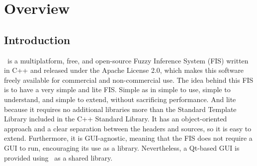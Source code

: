 \chapter{Overview}

\section{Introduction}
\fl\ is a multiplatform, free, and open-source Fuzzy Inference System (FIS) written in C++ and released under the Apache License 2.0, which makes this software freely available for commercial and non-commercial use. The idea behind this FIS is to have a very simple and lite FIS. Simple as in simple to use, simple to understand, and simple to extend, without sacrificing performance. And lite because it requires no additional libraries more than the Standard Template Library included in the C++ Standard Library. It has an object-oriented approach and a clear separation between the headers and sources, so it is easy to extend. Furthermore, it is GUI-agnostic, meaning that the FIS does not require a GUI to run, encouraging its use as a library. Nevertheless, a Qt-based GUI is provided using \fl\ as a shared library.

